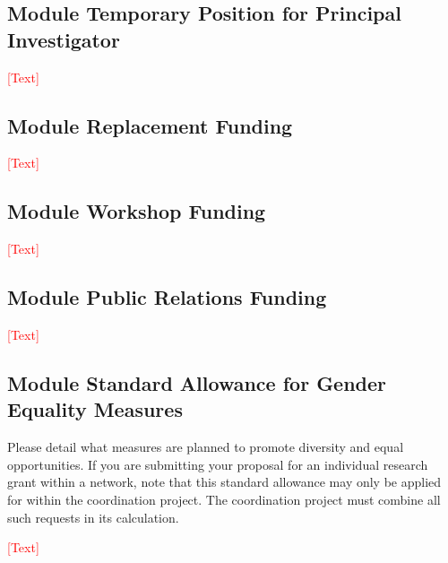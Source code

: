 \documentclass[a4paper,11pt]{article}
\begin{document}





\subsection{Module Temporary Position for Principal Investigator}

\noindent\textcolor{red}{[Text]}

\subsection{Module Replacement Funding}

\noindent\textcolor{red}{[Text]} 





\subsection{Module Workshop Funding}

\noindent\textcolor{red}{[Text]}

\subsection{Module Public Relations Funding}

\noindent\textcolor{red}{[Text]}

\subsection{Module Standard Allowance for Gender Equality Measures}
Please detail what measures are planned to promote diversity and equal opportunities.
If you are submitting your proposal for an individual research grant within a network, note that this standard allowance may only be applied for within the coordination project. The coordination project must combine all such requests in its calculation.

\noindent\textcolor{red}{[Text]}
\end{document}
